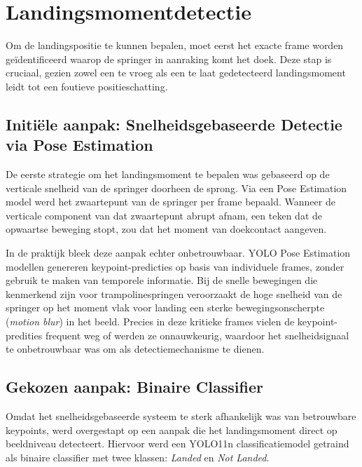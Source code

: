 
\section{Landingsmomentdetectie}
\label{sec:landingsmoment}

Om de landingspositie te kunnen bepalen, moet eerst het exacte frame worden geïdentificeerd waarop de springer in aanraking komt het doek. Deze stap is cruciaal, gezien zowel een te vroeg als een te laat gedetecteerd landingsmoment leidt tot een foutieve positieschatting.

\subsection{Initiële aanpak: Snelheidsgebaseerde Detectie via Pose Estimation}
\label{subsec:landingsmoment-pose}

De eerste strategie om het landingsmoment te bepalen was gebaseerd op de verticale snelheid van de springer doorheen de sprong. Via een Pose Estimation model werd het zwaartepunt van de springer per frame bepaald. Wanneer de verticale component van dat zwaartepunt abrupt afnam, een teken dat de opwaartse beweging stopt, zou dat het moment van doekcontact aangeven.

In de praktijk bleek deze aanpak echter onbetrouwbaar. YOLO Pose Estimation modellen genereren keypoint-predicties op basis van individuele frames, zonder gebruik te maken van temporele informatie. Bij de snelle bewegingen die kenmerkend zijn voor trampolinespringen veroorzaakt de hoge snelheid van de springer op het moment vlak voor landing een sterke bewegingsonscherpte (\textit{motion blur}) in het beeld. Precies in deze kritieke frames vielen de keypoint-predities frequent weg of werden ze onnauwkeurig, waardoor het snelheidsignaal te onbetrouwbaar was om als detectiemechanisme te dienen.

\subsection{Gekozen aanpak: Binaire Classifier}
\label{subsec:landingsmoment-classifier}

Omdat het snelheidsgebaseerde systeem te sterk afhankelijk was van betrouwbare keypoints, werd overgestapt op een aanpak die het landingsmoment direct op beeldniveau detecteert. Hiervoor werd een YOLO11n classificatiemodel \autocite{Jocher_Ultralytics_YOLO_2023} getraind als binaire classifier met twee klassen: \textit{Landed} en \textit{Not Landed}.

